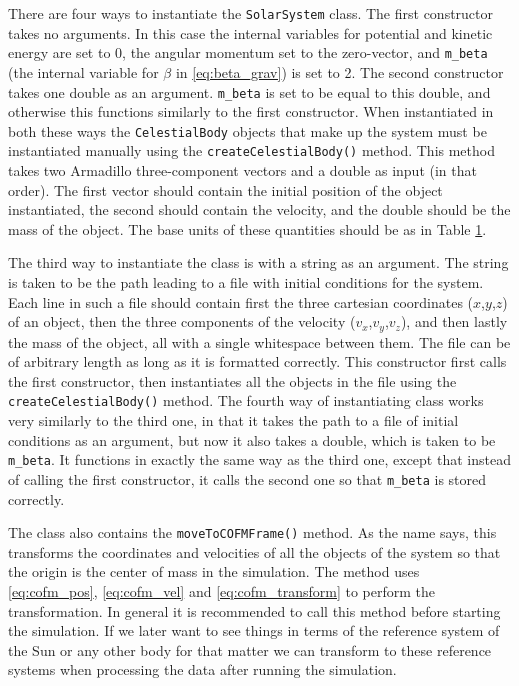 \documentclass[reprint,english,notitlepage]{revtex4-1}  %
\begin{document}
There are four ways to instantiate the \verb+SolarSystem+ class. The first constructor takes no arguments. In this case the internal variables for potential and kinetic energy are set to 0, the angular momentum set to the zero-vector, and \verb+m_beta+ (the internal variable for $\beta$ in \eqref{eq:beta_grav}) is set to 2. The second constructor takes one double as an argument. \verb+m_beta+ is set to be equal to this double, and otherwise this functions similarly to the first constructor. When instantiated in both these ways the \verb+CelestialBody+ objects that make up the system must be instantiated manually using the \verb+createCelestialBody()+ method. This method takes two Armadillo \citep{Armadillo} three-component vectors and a double as input (in that order). The first vector should contain the initial position of the object instantiated, the second should contain the velocity, and the double should be the mass of the object. The base units of these quantities should be as in Table \hyperref[table:III:a:i]{1}. \newline

\label{poi:initfile}
The third way to instantiate the class is with a string as an argument. The string is taken to be the path leading to a file with initial conditions for the system. Each line in such a file should contain first the three cartesian coordinates ($x$,$y$,$z$) of an object, then the three components of the velocity ($v_x$,$v_y$,$v_z$), and then  lastly the mass of the object, all with a single whitespace between them. The file can be of arbitrary length as long as it is formatted correctly. This constructor first calls the first constructor, then instantiates all the objects in the file using the \verb+createCelestialBody()+ method. The fourth way of instantiating class works very similarly to the third one, in that it takes the path to a file of initial conditions as an argument, but now it also takes a double, which is taken to be \verb+m_beta+. It functions in exactly the same way as the third one, except that instead of calling the first constructor, it calls the second one so that \verb+m_beta+ is stored correctly.

The class also contains the \verb+moveToCOFMFrame()+ method. As the name says, this transforms the coordinates and velocities of all the objects of the system so that the origin is the center of mass in the simulation. The method uses \eqref{eq:cofm_pos}, \eqref{eq:cofm_vel} and \eqref{eq:cofm_transform} to perform the transformation. In general it is recommended to call this method before starting the simulation. If we later want to see things in terms of the reference system of the Sun or any other body for that matter we can transform to these reference systems when processing the data after running the simulation. 
\end{document}
